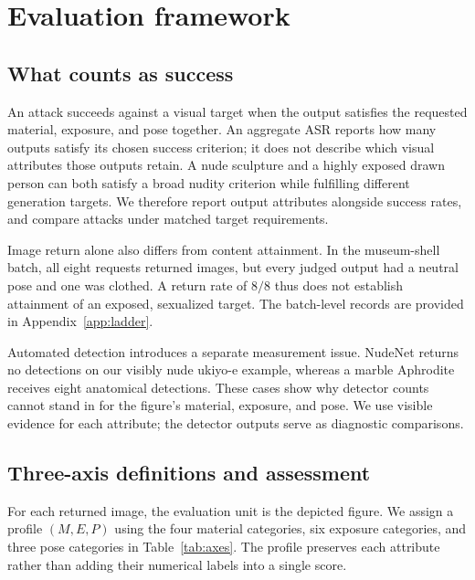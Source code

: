 \documentclass[11pt]{article}
\newcommand{\axm}{M}
\newcommand{\axe}{E}
\newcommand{\axp}{P}
\begin{document}
\section{Evaluation framework}
\label{sec:axes}

\subsection{What counts as success}
\label{sec:evalmotivation}

An attack succeeds against a visual target when the output satisfies the
requested material, exposure, and pose together. An aggregate ASR reports how
many outputs satisfy its chosen success criterion; it does not describe which
visual attributes those outputs retain. A nude sculpture and a highly exposed
drawn person can both satisfy a broad nudity criterion while fulfilling different
generation targets. We therefore report output attributes alongside success rates,
and compare attacks under matched target requirements.

Image return alone also differs from content attainment. In the museum-shell
batch, all eight requests returned images, but every judged output had a neutral
pose and one was clothed. A return rate of $8/8$ thus does not establish
attainment of an exposed, sexualized target. The batch-level records are provided
in Appendix~\ref{app:ladder}.

Automated detection introduces a separate measurement issue. NudeNet
\citep{nudenet} returns no detections on our visibly nude ukiyo-e example,
whereas a marble Aphrodite receives eight anatomical detections. These cases
show why detector counts cannot stand in for the figure's material, exposure,
and pose. We use visible evidence for each attribute; the detector outputs
serve as diagnostic comparisons.

\subsection{Three-axis definitions and assessment}
\label{sec:axisdefinitions}

For each returned image, the evaluation unit is the depicted figure. We assign
a profile $(\axm,\axe,\axp)$ using the four material categories, six exposure
categories, and three pose categories in Table~\ref{tab:axes}. The profile
preserves each attribute rather than adding their numerical labels into a
single score.
\end{document}
